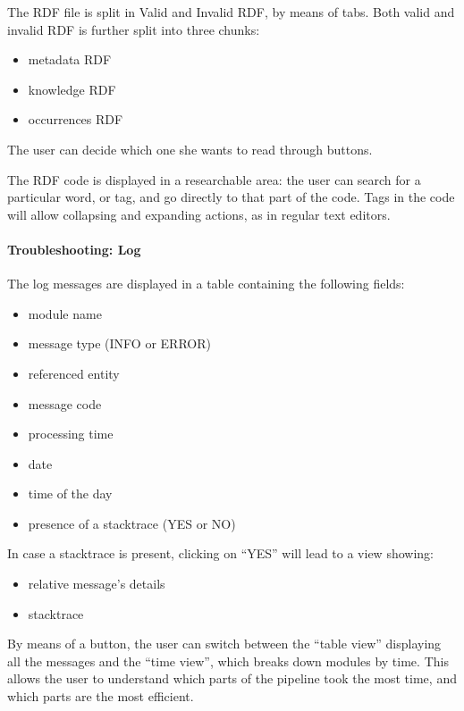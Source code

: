\documentclass[12pt,svgnames]{memoir}
\begin{document}
The RDF file is split in Valid and Invalid RDF, by means of tabs. Both
valid and invalid RDF is further split into three chunks:

\begin{itemize}
\itemsep1pt\parskip0pt
\item
  metadata RDF
\item
  knowledge RDF
\item
  occurrences RDF
\end{itemize}

The user can decide which one she wants to read through buttons.

The RDF code is displayed in a researchable area: the user can search
for a particular word, or tag, and go directly to that part of the code.
Tags in the code will allow collapsing and expanding actions, as in
regular text editors.

\paragraph*{Troubleshooting: Log}\label{troubleshooting-log}

The log messages are displayed in a table containing the following
fields:

\begin{itemize}
\itemsep1pt\parskip0pt
\item
  module name
\item
  message type (INFO or ERROR)
\item
  referenced entity
\item
  message code
\item
  processing time
\item
  date
\item
  time of the day
\item
  presence of a stacktrace (YES or NO)
\end{itemize}

In case a stacktrace is present, clicking on ``YES'' will lead to a view
showing:

\begin{itemize}
\itemsep1pt\parskip0pt
\item
  relative message's details
\item
  stacktrace
\end{itemize}

By means of a button, the user can switch between the ``table view''
displaying all the messages and the ``time view'', which breaks down
modules by time. This allows the user to understand which parts of the
pipeline took the most time, and which parts are the most efficient.
\end{document}
